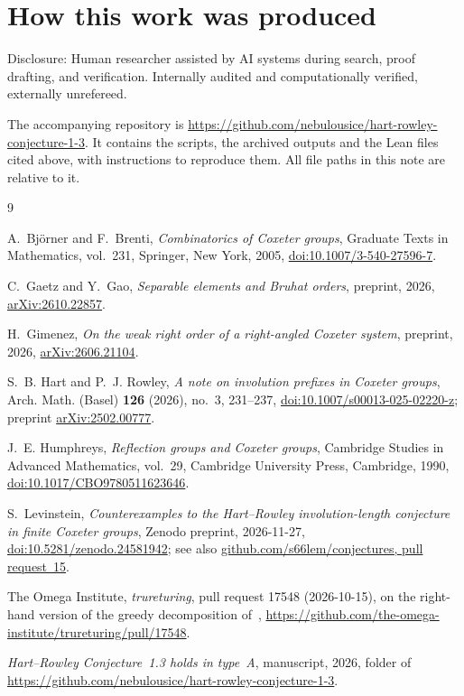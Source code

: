 \documentclass[11pt]{amsart}
\theoremstyle{definition}\newtheorem{definition}[theorem]{Definition}
\theoremstyle{remark}\newtheorem{remark}[theorem]{Remark}
\begin{document}
\section*{How this work was produced}
Disclosure: Human researcher assisted by AI systems during search, proof drafting, and verification. Internally audited and computationally verified, externally unrefereed.

The accompanying repository is \url{https://github.com/nebulousice/hart-rowley-conjecture-1-3}. It contains the scripts, the archived outputs and the Lean files cited above, with instructions to reproduce them. All file paths in this note are relative to it.


{\raggedright
\begin{thebibliography}{9}

A.~Bj\"orner and F.~Brenti, \emph{Combinatorics of {C}oxeter groups}, Graduate Texts in Mathematics, vol.~231, Springer, New York, 2005, \href{https://doi.org/10.1007/3-540-27596-7}{doi:10.1007/3-540-27596-7}.

C.~Gaetz and Y.~Gao, \emph{Separable elements and {B}ruhat orders}, preprint, 2026, \href{https://arxiv.org/abs/2610.22857}{arXiv:2610.22857}.

H.~Gimenez, \emph{On the weak right order of a right-angled {C}oxeter system}, preprint, 2026, \href{https://arxiv.org/abs/2606.21104}{arXiv:2606.21104}.

S.~B. Hart and P.~J. Rowley, \emph{A note on involution prefixes in {C}oxeter groups}, Arch. Math. (Basel) \textbf{126} (2026), no.~3, 231--237, \href{https://doi.org/10.1007/s00013-025-02220-z}{doi:10.1007/s00013-025-02220-z}; preprint \href{https://arxiv.org/abs/2502.00777}{arXiv:2502.00777}.

J.~E. Humphreys, \emph{Reflection groups and {C}oxeter groups}, Cambridge Studies in Advanced Mathematics, vol.~29, Cambridge University Press, Cambridge, 1990, \href{https://doi.org/10.1017/CBO9780511623646}{doi:10.1017/CBO9780511623646}.

S.~Levinstein, \emph{Counterexamples to the {H}art--{R}owley involution-length conjecture in finite {C}oxeter groups}, Zenodo preprint, 2026-11-27, \href{https://doi.org/10.5281/zenodo.24581942}{doi:10.5281/zenodo.24581942}; see also \href{https://github.com/s66lem/conjectures/pull/15}{github.com/s66lem/conjectures, pull request~15}.

The Omega Institute, \emph{trureturing}, pull request 17548 (2026-10-15), on the right-hand version of the greedy decomposition of~\cite{HR}, \url{https://github.com/the-omega-institute/trureturing/pull/17548}.

\emph{Hart--{R}owley {C}onjecture~1.3 holds in type~{A}}, manuscript, 2026, folder  of \url{https://github.com/nebulousice/hart-rowley-conjecture-1-3}.

\end{thebibliography}
}
\end{document}
